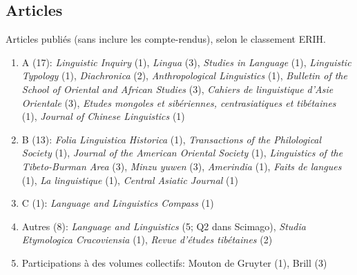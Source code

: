 \documentclass[oldfontcommands,oneside,a4paper,11pt]{article}
\begin{document}
    \subsection*{Articles}
  Articles publiés (sans inclure les compte-rendus), selon le classement ERIH.
    \begin{enumerate}
\item A (17): \textit{Linguistic Inquiry} (1), \textit{Lingua} (3), \textit{Studies in Language} (1), \textit{Linguistic Typology} (1), \textit{Diachronica} (2), \textit{Anthropological Linguistics} (1), \textit{Bulletin of the School of Oriental and African Studies} (3),  \textit{Cahiers de linguistique d’Asie Orientale} (3), \textit{Etudes mongoles et sibériennes, centrasiatiques et tibétaines} (1), \textit{Journal of Chinese Linguistics} (1)

\item B (13): \textit{Folia Linguistica Historica} (1), \textit{Transactions of the Philological Society} (1), \textit{Journal of the American Oriental Society} (1), \textit{Linguistics of the Tibeto-Burman Area} (3), \textit{Minzu yuwen} (3), \textit{Amerindia} (1), \textit{Faits de langues} (1), \textit{La linguistique} (1), \textit{Central Asiatic Journal} (1)
\item C (1): \textit{Language and Linguistics Compass} (1) 
\item Autres (8):       \textit{Language and Linguistics} (5; Q2 dans Scimago),   \textit{Studia Etymologica Cracoviensia} (1), \textit{Revue d'études tibétaines} (2)
\item Participations à des volumes collectifs: Mouton de Gruyter (1), Brill (3)
\end{enumerate}
\end{document}
